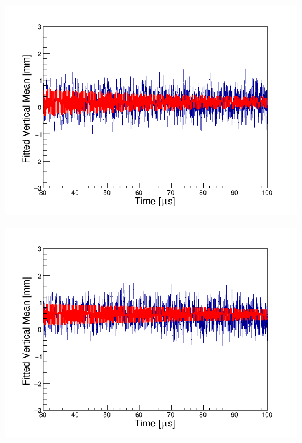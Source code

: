 
\begin{figure}
\centering
\begin{minipage}{.5\textwidth}
  \centering
  \includegraphics[width=\linewidth]{Figures/VertMeanTest_iterExp_station12.png}
  \label{fig:VertMeanTest_iterExp_station12.png}
\end{minipage}%
\begin{minipage}{.5\textwidth}
  \centering
  \includegraphics[width=\linewidth]{Figures/VertMeanTest_iterExp_station18.png}
  \label{fig:VertMeanTest_iterExp_station18.png}
\end{minipage}
\end{figure}

